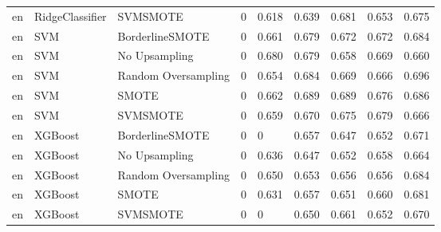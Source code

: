 \begin{tabular}{lllllllll}
      en &              RidgeClassifier &            SVMSMOTE &     0 &                     0.618 &                 0.639 &                  0.681 &                                   0.653 &     0.675 \\
      en &                          SVM &     BorderlineSMOTE &     0 &                     0.661 &                 0.679 &                  0.672 &                                   0.672 &     0.684 \\
      en &                          SVM &       No Upsampling &     0 &                     0.680 &                 0.679 &                  0.658 &                                   0.669 &     0.660 \\
      en &                          SVM & Random Oversampling &     0 &                     0.654 &                 0.684 &                  0.669 &                                   0.666 &     0.696 \\
      en &                          SVM &               SMOTE &     0 &                     0.662 &                 0.689 &                  0.689 &                                   0.676 &     0.686 \\
      en &                          SVM &            SVMSMOTE &     0 &                     0.659 &                 0.670 &                  0.675 &                                   0.679 &     0.666 \\
      en &                      XGBoost &     BorderlineSMOTE &     0 &                         0 &                 0.657 &                  0.647 &                                   0.652 &     0.671 \\
      en &                      XGBoost &       No Upsampling &     0 &                     0.636 &                 0.647 &                  0.652 &                                   0.658 &     0.664 \\
      en &                      XGBoost & Random Oversampling &     0 &                     0.650 &                 0.653 &                  0.656 &                                   0.656 &     0.684 \\
      en &                      XGBoost &               SMOTE &     0 &                     0.631 &                 0.657 &                  0.651 &                                   0.660 &     0.681 \\
      en &                      XGBoost &            SVMSMOTE &     0 &                         0 &                 0.650 &                  0.661 &                                   0.652 &     0.670 \\

\end{tabular}
